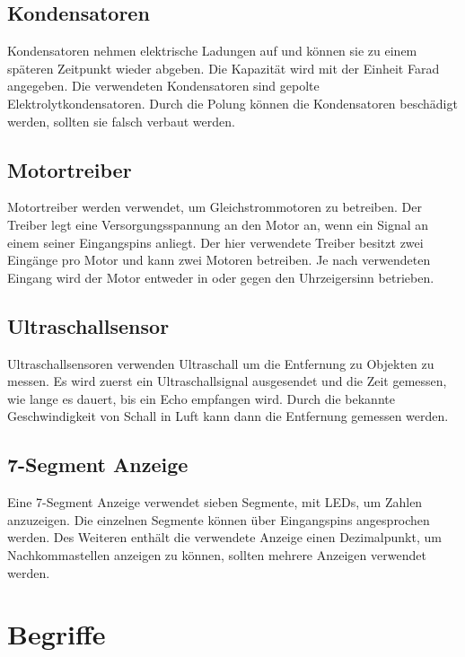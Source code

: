 \newpage

\subsection{Kondensatoren \cite{kondesator}}
\label{subsec:kondensatoren}

Kondensatoren nehmen elektrische Ladungen auf und können sie zu einem späteren Zeitpunkt wieder abgeben.
Die Kapazität wird mit der Einheit Farad angegeben.
Die verwendeten Kondensatoren sind gepolte Elektrolytkondensatoren.
Durch die Polung können die Kondensatoren beschädigt werden, sollten sie falsch verbaut werden.

\subsection{Motortreiber}
\label{subsec:motortreiber}

Motortreiber werden verwendet, um Gleichstrommotoren zu betreiben.
Der Treiber legt eine Versorgungsspannung an den Motor an, wenn ein Signal an einem seiner Eingangspins anliegt.
Der hier verwendete Treiber besitzt zwei Eingänge pro Motor und kann zwei Motoren betreiben.
Je nach verwendeten Eingang wird der Motor entweder in oder gegen den Uhrzeigersinn betrieben.

\subsection{Ultraschallsensor}
\label{subsec:ultraschallsensor}

Ultraschallsensoren verwenden Ultraschall um die Entfernung zu Objekten zu messen.
Es wird zuerst ein Ultraschallsignal ausgesendet und die Zeit gemessen, wie lange es dauert, bis ein Echo empfangen wird.
Durch die bekannte Geschwindigkeit von Schall in Luft kann dann die Entfernung gemessen werden.

\subsection{7-Segment Anzeige}
\label{subsec:7-segment-anzeige}

Eine 7-Segment Anzeige verwendet sieben Segmente, mit LEDs, um Zahlen anzuzeigen.
Die einzelnen Segmente können über Eingangspins angesprochen werden.
Des Weiteren enthält die verwendete Anzeige einen Dezimalpunkt, um Nachkommastellen anzeigen zu können, sollten mehrere Anzeigen verwendet werden.

\section{Begriffe}
\label{sec:begriffe}

